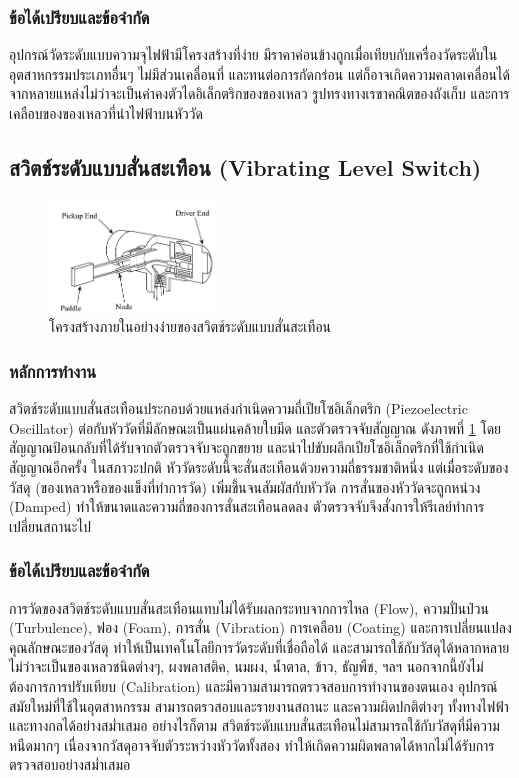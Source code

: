 \documentclass[final,11pt]{article}
\begin{document}
\subsubsection{ข้อได้เปรียบและข้อจำกัด}
อุปกรณ์วัดระดับแบบความจุไฟฟ้ามีโครงสร้างที่ง่าย มีราคาค่อนข้างถูกเมื่อเทียบกับเครื่องวัดระดับในอุตสาหกรรมประเภทอื่นๆ ไม่มีส่วนเคลื่อนที่ และทนต่อการกัดกร่อน
แต่ก็อาจเกิดความคลาดเคลื่อนได้จากหลายแหล่งไม่ว่าจะเป็นค่าคงตัวไดอิเล็กตริกของของเหลว รูปทรงทางเรขาคณิตของถังเก็บ และการเคลือบของของเหลวที่นำไฟฟ้าบนหัววัด
\subsection{สวิตช์ระดับแบบสั่นสะเทือน (Vibrating Level Switch)}
\begin{figure}[h]
    \centering
    \includegraphics[width=0.4\textwidth]{images/Screenshot_11.jpg}
    \caption{โครงสร้างภายในอย่างง่ายของสวิตช์ระดับแบบสั่นสะเทือน}
    \label{fig:vls}
\end{figure}
\subsubsection{หลักการทำงาน}
สวิตช์ระดับแบบสั่นสะเทือนประกอบด้วยแหล่งกำเนิดความถี่เปียโซอิเล็กตริก (Piezoelectric Oscillator) ต่อกับหัววัดที่มีลักษณะเป็นแผ่นคล้ายใบมีด 
และตัวตรวจจับสัญญาณ ดังภาพที่ \ref{fig:vls} โดยสัญญาณป้อนกลับที่ได้รับจากตัวตรวจจับจะถูกขยาย และนำไปขับผลึกเปียโซอิเล็กตริกที่ใช้กำเนิดสัญญาณอีกครั้ง
ในสภาวะปกติ หัววัดระดับนี้จะสั่นสะเทือนด้วยความถี่ธรรมชาติหนึ่ง แต่เมื่อระดับของวัสดุ (ของเหลวหรือของแข็งที่ทำการวัด) เพิ่มขึ้นจนสัมผัสกับหัววัด 
การสั่นของหัววัดจะถูกหน่วง (Damped) ทำให้ขนาดและความถี่ของการสั่นสะเทือนลดลง ตัวตรวจจับจึงสั่งการให้รีเลย์ทำการเปลี่ยนสถานะไป

\subsubsection{ข้อได้เปรียบและข้อจำกัด}
การวัดของสวิตช์ระดับแบบสั่นสะเทือนแทบไม่ได้รับผลกระทบจากการไหล (Flow), ความปั่นป่วน (Turbulence), ฟอง (Foam), การสั่น (Vibration)
การเคลือบ (Coating) และการเปลี่ยนแปลงคุณลักษณะของวัสดุ ทำให้เป็นเทคโนโลยีการวัดระดับที่เชื่อถือได้ และสามารถใช้กับวัสดุได้หลากหลาย ไม่ว่าจะเป็นของเหลวชนิดต่างๆ,
ผงพลาสติค, นมผง, น้ำตาล, ข้าว, ธัญพืช, ฯลฯ นอกจากนี้ยังไม่ต้องการการปรับเทียบ (Calibration) และมีความสามารถตรวจสอบการทำงานของตนเอง อุปกรณ์สมัยใหม่ที่ใช้ในอุตสาหกรรม 
สามารถตรวสอบและรายงานสถานะ และความผิดปกติต่างๆ ทั้งทางไฟฟ้าและทางกลได้อย่างสม่ำเสมอ อย่างไรก็ตาม 
สวิตช์ระดับแบบสั่นสะเทือนไม่สามารถใช้กับวัสดุที่มีความหนืดมากๆ เนื่องจากวัสดุอาจจับตัวระหว่างหัววัดทั้งสอง ทำให้เกิดความผิดพลาดได้หากไม่ได้รับการตรวจสอบอย่างสม่ำเสมอ 
\end{document}

